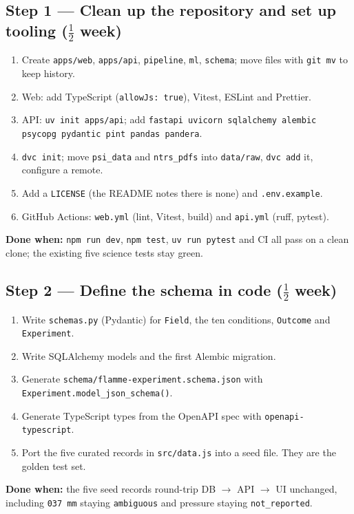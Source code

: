 \documentclass[11pt,a4paper]{article}
\newcommand{\code}[1]{\texttt{#1}}
\newcommand{\done}[1]{\begin{donebox}\textbf{Done when:} #1\end{donebox}}
\begin{document}
\subsection{Step 1 --- Clean up the repository and set up tooling \hfill\normalfont\small ($\tfrac{1}{2}$ week)}
\begin{enumerate}
  \item Create \code{apps/web}, \code{apps/api}, \code{pipeline}, \code{ml}, \code{schema}; move files with \code{git mv} to keep history.
  \item Web: add TypeScript (\code{allowJs: true}), Vitest, ESLint and Prettier.
  \item API: \code{uv init apps/api}; add \code{fastapi uvicorn sqlalchemy alembic psycopg pydantic pint pandas pandera}.
  \item \code{dvc init}; move \code{psi\_data} and \code{ntrs\_pdfs} into \code{data/raw}, \code{dvc add} it, configure a remote.
  \item Add a \code{LICENSE} (the README notes there is none) and \code{.env.example}.
  \item GitHub Actions: \code{web.yml} (lint, Vitest, build) and \code{api.yml} (ruff, pytest).
\end{enumerate}
\done{\code{npm run dev}, \code{npm test}, \code{uv run pytest} and CI all pass on a clean clone; the existing five science tests stay green.}

\subsection{Step 2 --- Define the schema in code \hfill\normalfont\small ($\tfrac{1}{2}$ week)}
\begin{enumerate}
  \item Write \code{schemas.py} (Pydantic) for \code{Field}, the ten conditions, \code{Outcome} and \code{Experiment}.
  \item Write SQLAlchemy models and the first Alembic migration.
  \item Generate \code{schema/flamme-experiment.schema.json} with \code{Experiment.model\_json\_schema()}.
  \item Generate TypeScript types from the OpenAPI spec with \code{openapi-typescript}.
  \item Port the five curated records in \code{src/data.js} into a seed file. They are the golden test set.
\end{enumerate}
\done{the five seed records round-trip DB $\rightarrow$ API $\rightarrow$ UI unchanged, including \code{037 mm} staying \code{ambiguous} and pressure staying \code{not\_reported}.}
\end{document}
